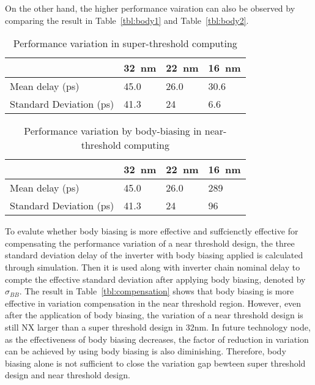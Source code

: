 On the other hand, the higher performance vairation can also be observed by comparing the result in Table~\ref{tbl:body1} and Table~\ref{tbl:body2}. 

\begin{table}
  \caption{Performance variation in super-threshold computing} 
  \centering 
  \label{tbl:body3}
  \begin{tabular}{ | l | l | l | l | }
    \hline
    & \SI{32}{\nano\meter} & \SI{22}{\nano\meter} & \SI{16}{\nano\meter} \\ \hline
    Mean delay (ps) & 45.0 & 26.0 & 30.6 \\ \hline
    Standard Deviation (ps)  & 41.3 & 24 & 6.6 \\  \hline
    \hline
  \end{tabular}
\end{table}



\begin{table}
  \caption {Performance variation by body-biasing in near-threshold computing}  
  \centering
  \label{tbl:body4}
  \begin{tabular}{ | l | l | l | l | }
    \hline
    & \SI{32}{\nano\meter} & \SI{22}{\nano\meter} & \SI{16}{\nano\meter} \\ \hline
    Mean delay (ps) & 45.0 & 26.0 & 289 \\ \hline
    Standard Deviation (ps)  & 41.3 & 24 & 96 \\  \hline
    \hline
  \end{tabular}
\end{table}

To evalute whether body biasing is more effective and suffcienctly effective for compensating the performance variation of a near threshold design, the three standard deviation delay of the inverter with body biasing applied is calculated through simulation. Then it is used along with inverter chain nominal delay to compte the effective standard deviation after applying body biasing, denoted by $\sigma_{BB}$. The result in Table~\ref{tbl:compensation} shows that body biasing is more effective in variation compensation in the near threshold region. However, even after the application of body biasing, the variation of a near threshold design is still NX larger than a super threshold  design in 32nm. In future technology node, as the effectiveness of body biasing decreases, the factor of reduction in variation can be achieved by using body biasing is also diminishing. Therefore, body biasing alone is not sufficient to close the variation gap bewteen super threshold design and near threshold design.    

